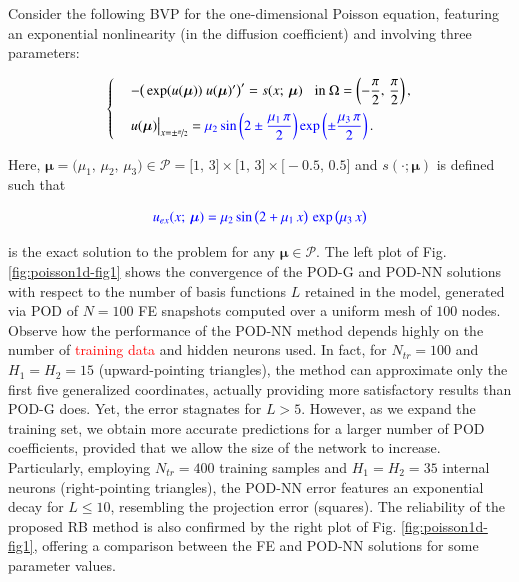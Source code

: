 \documentclass[longtitle]{elsarticle}
\numberwithin{equation}{section}
\theoremstyle{theorem}
\theoremstyle{definition}
\theoremstyle{remark}
\theoremstyle{proposition}
\numberwithin{figure}{section}
\newcommand{\bg}[1]{\boldsymbol{#1}}
\begin{document}
		Consider the following BVP for the one-dimensional Poisson equation, featuring an exponential nonlinearity (in the diffusion coefficient) and involving three parameters:
		\vspace*{-0.2cm}
		\begin{linenomath}\begin{equation}
			\label{eq:poisson1d}
			\begin{cases}
				& - \big( \exp(u(\bg{\mu})) ~ u(\bg{\mu})' \big)' = s(x; \, \bg{\mu}) \hspace*{0.3cm} \text{in $\Omega = \left( -\dfrac{\pi}{2}, \, \dfrac{\pi}{2} \right)$} \, , \\[0.3cm]
				& u(\bg{\mu}) \big|_{x = \pm \nicefrac{\pi}{2}} = \textcolor{blue}{\mu_2 \sin\left( 2 \pm \dfrac{\mu_1 \, \pi}{2} \right) \exp \left( \pm \dfrac{\mu_3 \, \pi}{2} \right)} \, .
			\end{cases}
			\vspace*{-0.2cm}
		\end{equation}\end{linenomath}
		Here, $\bg{\mu} = \big(\mu_1, \, \mu_2, \, \mu_3 \big) \in \mathcal{P} = \big[ 1, \, 3 \big] \times \big[ 1, \, 3 \big] \times \big[ -0.5, \, 0.5 \big]$ and $s(\cdot; \bg{\mu})$ is defined such that 
		\vspace*{-0.2cm}
		\begin{linenomath}\begin{equation*}
			\textcolor{blue}{u_{ex}(x; \, \bg{\mu}) = \mu_2 \sin \big(2 + \mu_1 \, x \big) \, \exp \big( \mu_3 \, x \big)} 
			\vspace*{-0.2cm}
		\end{equation*}\end{linenomath}
		is the exact solution to the problem for any $\bg{\mu} \in \mathcal{P}$. The left plot of Fig. \ref{fig:poisson1d-fig1} shows the convergence of the POD-G and POD-NN solutions with respect to the number of basis functions $L$ retained in the model, generated via POD of $N = 100$ FE snapshots computed over a uniform mesh of $100$ nodes. Observe how the performance of the POD-NN method depends highly on the number of \textcolor{red}{training data} and hidden neurons used. In fact, for $N_{tr} = 100$ and $H_1 = H_2 = 15$ (upward-pointing triangles), the method can approximate only the first five generalized coordinates, actually providing more satisfactory results than POD-G does. Yet, the error stagnates for $L > 5$. However, as we expand the training set, we obtain more accurate predictions for a larger number of POD coefficients, provided that we allow the size of the network to increase. Particularly, employing $N_{tr} = 400$ training samples and $H_1 = H_2 = 35$ internal neurons (right-pointing triangles), the POD-NN error features an exponential decay for $L \leq 10$, resembling the projection error (squares). The reliability of the proposed RB method is also confirmed by the right plot of Fig. \ref{fig:poisson1d-fig1}, offering a comparison between the FE and POD-NN solutions for some parameter values.
				
\end{document}

